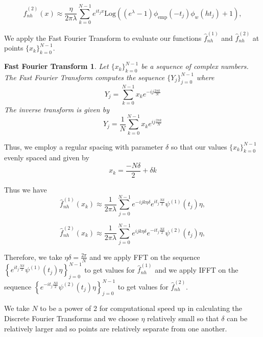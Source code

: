 \documentclass[a4paper,11pt]{article}
\theoremstyle{theorem}
\newtheorem*{fft}{Fast Fourier Transform}
\theoremstyle{definition}
\theoremstyle{remark}
\begin{document}
\begin{equation}
\hat{f}_{nh}^{(2)}(x) \approx \frac{\eta}{2\pi\lambda}\sum_{k=0}^{N-1}{e^{it_{j}x}\text{Log}\left((e^{\lambda} - 1)\phi_{\text{emp}}(-t_{j})\phi_{w}(ht_{j}) + 1\right)},
\end{equation}

We apply the Fast Fourier Transform to evaluate our functions $\hat{f}_{nh}^{(1)}$ and $\hat{f}_{nh}^{(2)}$ at points $\{x_{k}\}_{k=0}^{N-1}$.

\begin{fft}
Let $\{x_{k}\}_{k=0}^{N-1}$ be a sequence of complex numbers. The Fast Fourier Transform computes the sequence $\{Y_{j}\}_{j=0}^{N-1}$ where
\begin{equation}
Y_{j} = \sum_{k=0}^{N-1}{x_{k}e^{-ij\frac{2\pi k}{N}}}
\end{equation}
The inverse transform is given by
\begin{equation}
Y_{j} = \frac{1}{N}\sum_{k=0}^{N-1}{x_{k}e^{ij\frac{2\pi k}{N}}}
\end{equation}
\end{fft}

Thus, we employ a regular spacing with parameter $\delta$ so that our values $\{x_{k}\}_{k=0}^{N-1}$ evenly spaced and given by
\[
x_{k} = \frac{-N\delta}{2} + \delta k
\]

Thus we have
\begin{equation}
\hat{f}_{nh}^{(1)}(x_{k}) \approx \frac{1}{2\pi\lambda}\sum_{j=0}^{N-1}{e^{-ijk\eta\delta}e^{it_{j}\frac{N\delta}{2}}\psi^{(1)}(t_{j})\eta},
\end{equation}

\begin{equation}
\hat{f}_{nh}^{(2)}(x_{k}) \approx \frac{1}{2\pi\lambda}\sum_{j=0}^{N-1}{e^{ijk\eta\delta}e^{-it_{j}\frac{N\delta}{2}}\psi^{(2)}(t_{j})\eta},
\end{equation}

Therefore, we take $\eta\delta = \frac{2\pi}{N}$ and we apply FFT on the sequence $\left\lbrace e^{it_{j}\frac{N\delta}{2}}\psi^{(1)}(t_{j})\eta \right\rbrace_{j=0}^{N-1}$ to get values for $\hat{f}_{nh}^{(1)}$ and we apply IFFT on the sequence $\left\lbrace e^{-it_{j}\frac{N\delta}{2}}\psi^{(2)}(t_{j})\eta \right\rbrace_{j=0}^{N-1}$ to get values for $\hat{f}_{nh}^{(2)}$.

We take $N$ to be a power of 2 for computational speed up in calculating the Discrete Fourier Transforms and we choose $\eta$ relatively small so that $\delta$ can be relatively larger and so points are relatively separate from one another.
\end{document}
